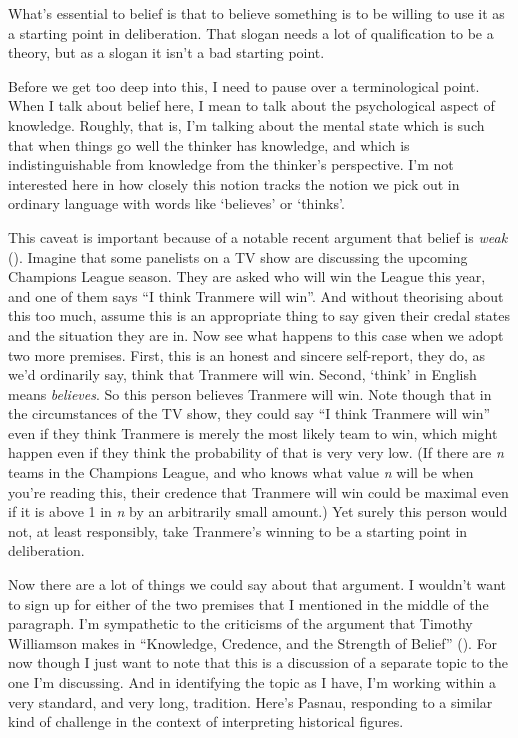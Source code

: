 \documentclass[
  10pt,
  letterpaper,
  twoside]{scrbook}
\begin{document}
What's essential to belief is that to believe something is to be willing
to use it as a starting point in deliberation. That slogan needs a lot
of qualification to be a theory, but as a slogan it isn't a bad starting
point.

Before we get too deep into this, I need to pause over a terminological
point. When I talk about belief here, I mean to talk about the
psychological aspect of knowledge. Roughly, that is, I'm talking about
the mental state which is such that when things go well the thinker has
knowledge, and which is indistinguishable from knowledge from the
thinker's perspective. I'm not interested here in how closely this
notion tracks the notion we pick out in ordinary language with words
like `believes' or `thinks'.

This caveat is important because of a notable recent argument that
belief is \emph{weak} (). Imagine that some panelists on a TV show
are discussing the upcoming Champions League season. They are asked who
will win the League this year, and one of them says ``I think Tranmere
will win''. And without theorising about this too much, assume this is
an appropriate thing to say given their credal states and the situation
they are in. Now see what happens to this case when we adopt two more
premises. First, this is an honest and sincere self-report, they do, as
we'd ordinarily say, think that Tranmere will win. Second, `think' in
English means \emph{believes}. So this person believes Tranmere will
win. Note though that in the circumstances of the TV show, they could
say ``I think Tranmere will win'' even if they think Tranmere is merely
the most likely team to win, which might happen even if they think the
probability of that is very very low. (If there are \emph{n} teams in
the Champions League, and who knows what value \emph{n} will be when
you're reading this, their credence that Tranmere will win could be
maximal even if it is above 1 in \emph{n} by an arbitrarily small
amount.) Yet surely this person would not, at least responsibly, take
Tranmere's winning to be a starting point in deliberation.

Now there are a lot of things we could say about that argument. I
wouldn't want to sign up for either of the two premises that I mentioned
in the middle of the paragraph. I'm sympathetic to the criticisms of the
argument that Timothy Williamson makes in ``Knowledge, Credence, and the
Strength of Belief'' ().
For now though I just want to note that this is a discussion of a
separate topic to the one I'm discussing. And in identifying the topic
as I have, I'm working within a very standard, and very long, tradition.
Here's Pasnau, responding to a similar kind of challenge in the context
of interpreting historical figures.
\end{document}
